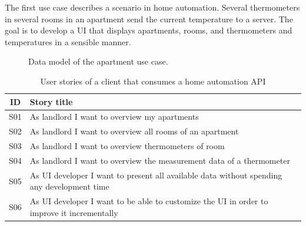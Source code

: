 The first use case describes a scenario in home automation. Several thermometers in several rooms in an apartment send the current temperature to a server. The goal is to develop a UI that displays apartments, rooms, and thermometers and temperatures in a sensible manner.

\begin{figure}[!htb]
  \caption{Data model of the apartment use case.}
\end{figure}

\begin{table}
  \begin{center}
    \begin{tabular}{ |c|l| }
      \hline
      ID & Story title \\
      \hline
      S01 & As landlord I want to overview my apartments \\
      S02 & As landlord I want to overview all rooms of an apartment \\
      S03 & As landlord I want to overview thermometers of room \\
      S04 & As landlord I want to overview the measurement data of a thermometer \\
      S05 & As UI developer I want to present all available data without spending any development time \\
      S06 & As UI developer I want to be able to customize the UI in order to improve it incrementally \\
      \hline
    \end{tabular}
    \caption{User stories of a client that consumes a home automation API}
    \label{tab:usecase1}
  \end{center}
\end{table}

